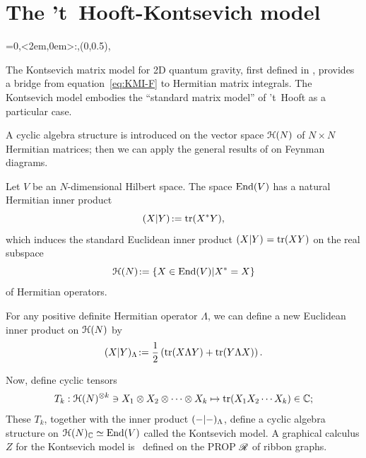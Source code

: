 \section{The 't~Hooft-Kontsevich model}
\label{sec:matrix-models}
\everyxy={0,<2em,0em>:,(0,0.5),} %

The Kontsevich matrix model for 2D quantum gravity, first defined in
\cite{kontsevich;intersection-theory;1992}, provides a bridge from
equation~\eqref{eq:KMI-F} to Hermitian matrix integrals. The
Kontsevich model embodies the ``standard matrix model'' of 't~Hooft as
a particular case. 

A cyclic algebra structure is introduced on the vector space
$\Hermitian[N]$ of $N\times N$ Hermitian matrices; then we can apply the
general results of  on Feynman diagrams.

Let $V$ be an $N$-dimensional Hilbert space. The space $\End(V)$
has a natural Hermitian inner product
\begin{equation*} 
  \inner{X}{Y}\joinrel:=\tr(X^*Y),
\end{equation*}
which induces the standard Euclidean inner product $\inner{X}{Y} =
\tr(XY)$ on the real subspace
\begin{equation*}
  \Hermitian[N]\joinrel:=\{X\in \End(V) | X^*=X\}
\end{equation*}
of Hermitian operators.  

For any positive definite Hermitian operator $\Lambda$, we can define
a new Euclidean inner product on $\Hermitian[N]$ by
\begin{equation*}
  \inner[\Lambda]{X}{Y} \joinrel:= 
  \onehalf \left(\tr(X\Lambda Y) + \tr(Y\Lambda X)\right).
\end{equation*}

Now, define cyclic tensors
\begin{equation*}
  T_k:\Hermitian[N]\tp{k} \ni X_1 \otimes X_2 \otimes \dots \otimes X_k 
  \mapsto 
  \tr(X_1X_2\cdots X_k) \in \setC;
\end{equation*}
These $T_k$, together with the inner product $\inner[\Lambda]{-}{-}$,
define a cyclic algebra structure on $\Hermitian[N]_\setC\simeq \End(V)$
called the Kontsevich model. A graphical calculus $Z$ for the Kontsevich
model is ~defined on the PROP $\RG$ of ribbon graphs.

